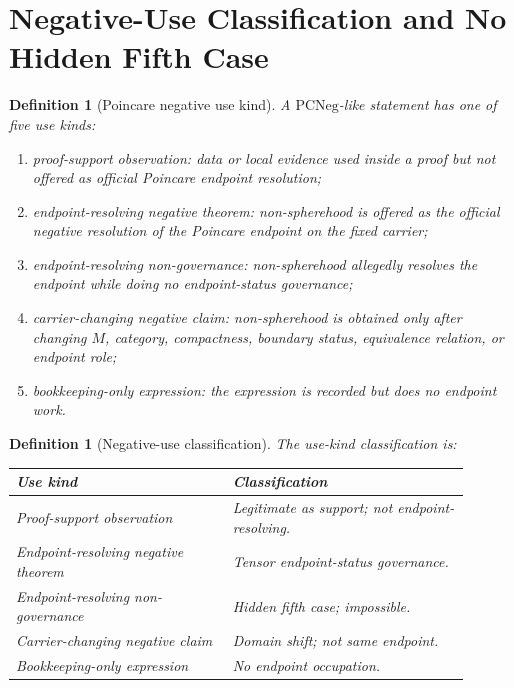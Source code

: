 \documentclass[11pt]{article}
\newtheorem{definition}[theorem]{Definition}
\newcommand{\PCNeg}{\mathrm{PCNeg}}
\begin{document}
\section{Negative-Use Classification and No Hidden Fifth Case}\label{sec:no-fifth}

\begin{definition}[Poincare negative use kind]
A \(\PCNeg\)-like statement has one of five use kinds:
\begin{enumerate}[label=(\roman*)]
\item proof-support observation: data or local evidence used inside a proof but not offered as official Poincare endpoint resolution;
\item endpoint-resolving negative theorem: non-spherehood is offered as the official negative resolution of the Poincare endpoint on the fixed carrier;
\item endpoint-resolving non-governance: non-spherehood allegedly resolves the endpoint while doing no endpoint-status governance;
\item carrier-changing negative claim: non-spherehood is obtained only after changing \(M\), category, compactness, boundary status, equivalence relation, or endpoint role;
\item bookkeeping-only expression: the expression is recorded but does no endpoint work.
\end{enumerate}
\end{definition}

\begin{definition}[Negative-use classification]
The use-kind classification is:
\begin{longtable}{L{0.43\linewidth}L{0.47\linewidth}}
\toprule
\textbf{Use kind} & \textbf{Classification}\\
\midrule
Proof-support observation & Legitimate as support; not endpoint-resolving.\\
Endpoint-resolving negative theorem & Tensor endpoint-status governance.\\
Endpoint-resolving non-governance & Hidden fifth case; impossible.\\
Carrier-changing negative claim & Domain shift; not same endpoint.\\
Bookkeeping-only expression & No endpoint occupation.\\
\bottomrule
\end{longtable}
\end{definition}
\end{document}

